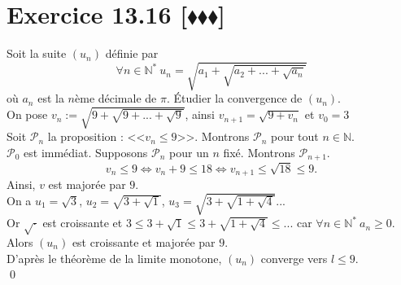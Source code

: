 \documentclass[10pt]{article}
\begin{document}
\section*{Exercice 13.16 [$\blacklozenge\blacklozenge\blacklozenge$]}
\begin{tcolorbox}[enhanced, width=7.6in, center, size=fbox, fontupper=\large, drop shadow southwest]
    Soit la suite $(u_n)$ définie par
    \begin{equation*}
        \forall n\in\mathbb{N}^* ~ u_n = \sqrt{a_1 + \sqrt{a_2 + ... + \sqrt{a_n}}}
    \end{equation*}
    où $a_n$ est la $n$ème décimale de $\pi$. Étudier la convergence de $(u_n)$.\\
    On pose $v_n := \sqrt{9 + \sqrt{9 + ... + \sqrt{9}}}$, ainsi $v_{n+1} = \sqrt{9 + v_n}$ et $v_0 = 3$\\
    Soit $\mathcal{P}_n$ la proposition : <<$v_n \leq 9$>>. Montrons $\mathcal{P}_n$ pour tout $n\in\mathbb{N}$.\\
    $\mathcal{P}_0$ est immédiat. Supposons $\mathcal{P}_n$ pour un $n$ fixé. Montrons $\mathcal{P}_{n+1}$.
    \begin{equation*}
        v_n \leq 9 \iff v_n + 9 \leq 18 \iff v_{n+1} \leq \sqrt{18} \leq 9.
    \end{equation*}
    Ainsi, $v$ est majorée par $9$.\\
    On a $u_1 = \sqrt{3}$, $u_2 = \sqrt{3 + \sqrt{1}}$, $u_3 = \sqrt{3 + \sqrt{1 + \sqrt{4}}}...$\\
    Or $\sqrt{\cdot}$ est croissante et $3 \leq 3 + \sqrt{1} \leq 3 + \sqrt{1 + \sqrt{4}} \leq ...$ car $\forall{n\in\mathbb{N}^*} ~ a_n \geq 0$.\\
    Alors $(u_n)$ est croissante et majorée par $9$.\\
    D'après le théorème de la limite monotone, $(u_n)$ converge vers $l\leq9$.\\
    \qed 
\end{tcolorbox}
\end{document}
